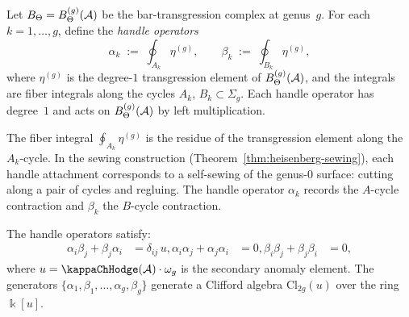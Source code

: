 \begin{definition}
Let $B_\Theta = B_\Theta^{(g)}(\mathcal{A})$ be the bar-transgression complex
at genus~$g$. For each $k = 1, \ldots, g$, define the
\emph{handle operators}
\begin{equation}%
\alpha_k \;:=\; \oint_{A_k} \eta^{(g)},
\qquad
\beta_k \;:=\; \oint_{B_k} \eta^{(g)},
\end{equation}
where $\eta^{(g)}$ is the degree-$1$ transgression element of
$B_\Theta^{(g)}(\mathcal{A})$, and the integrals are fiber integrals along
the cycles $A_k$, $B_k \subset \Sigma_g$. Each handle operator has
degree~$1$ and acts on $B_\Theta^{(g)}(\mathcal{A})$ by left multiplication.
\end{definition}

\begin{remark}
The fiber integral $\oint_{A_k} \eta^{(g)}$ is the residue of the
transgression element along the $A_k$-cycle. In the sewing
construction (Theorem~\ref{thm:heisenberg-sewing}), each handle
attachment corresponds to a self-sewing of the genus-$0$ surface:
cutting along a pair of cycles and regluing. The handle operator
$\alpha_k$ records the $A$-cycle contraction and $\beta_k$ the
$B$-cycle contraction.
\end{remark}

\begin{theorem}
The handle operators satisfy:
\begin{align}
\alpha_i \beta_j + \beta_j \alpha_i &= \delta_{ij}\, u,
\alpha_i \alpha_j + \alpha_j \alpha_i &= 0,
\beta_i \beta_j + \beta_j \beta_i &= 0,
\end{align}
where $u = \kappaChHodge(\cA) \cdot \omega_g$ is the secondary anomaly
element. The generators
$\{\alpha_1, \beta_1, \ldots, \alpha_g, \beta_g\}$
generate a Clifford algebra $\mathrm{Cl}_{2g}(u)$ over the ring
$\Bbbk[u]$.
\end{theorem}

